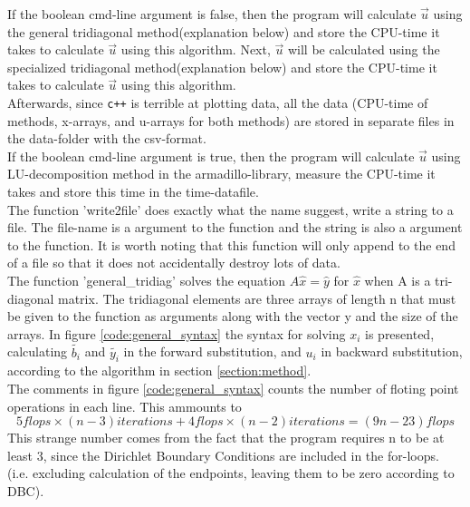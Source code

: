 \documentclass[11pt,a4paper,notitlepage]{article}
\begin{document}
	If the boolean cmd-line argument is false, then the program will calculate $\vec{u}$ using the general tridiagonal method(explanation below) and store the CPU-time it takes to calculate $\vec{u}$ using this algorithm.
	Next, $\vec{u}$ will be calculated using the specialized tridiagonal method(explanation below) and store the CPU-time it takes to calculate $\vec{u}$ using this algorithm. \\
	Afterwards, since \verb|c++| is terrible at plotting data, all the data (CPU-time of methods, x-arrays, and u-arrays for both methods) are stored in separate files in the data-folder with the csv-format. \\
	
	If the boolean cmd-line argument is true, then the program will calculate $\vec{u}$ using LU-decomposition method in the armadillo-library, measure the CPU-time it takes and store this time in the time-datafile. \\
	
	The function 'write2file' does exactly what the name suggest, 
	write a string to a file. The file-name is a argument to the function and the string is also a argument to the function. 
	It is worth noting that this function will only append to the end of a file so that it does not accidentally destroy lots of data.\\

	The function 'general\_tridiag' solves the equation $A\hat{x} = \hat{y}$ for $\hat{x}$ when A is a tri-diagonal matrix.
	The tridiagonal elements are three arrays of length n that must be given to the function as arguments along with the vector y and the size of the arrays. In figure \ref{code:general_syntax} the syntax for solving $x_i$ is presented, calculating $\tilde{b_i}$ and $\tilde{y_i}$ in the forward substitution, and $u_i$ in backward substitution, according to the algorithm in section \ref{section:method}. \\
	The comments in figure \ref{code:general_syntax} counts the number of floting point operations in each line. This ammounts to $$5 flops\times(n-3)iterations + 4 flops \times (n-2)iterations = (9n - 23) flops $$ This strange number comes from the fact that the program requires n to be at least 3, since the Dirichlet Boundary Conditions are included in the for-loops. (i.e. excluding calculation of the endpoints, leaving them to be zero according to DBC).\\
	
\end{document}
